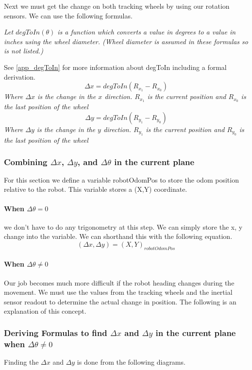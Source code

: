 \documentclass[12pt]{article}
\begin{document}
Next we must get the change on both tracking wheels by using our rotation sensors. We can use the following formulas.

\textit{Let $degToIn(\theta)$ is a function which converts a value in degrees to a value in inches using the wheel diameter. (Wheel diameter is assumed in these formulas so is not listed.)}

See \ref{app_degToIn} for more information about degToIn including a formal derivation.
$$
    \Delta x = degToIn(R_{x_1} - R_{x_0})
$$
\textit{Where $\Delta x$ is the change in the $x$ direction. $R_{x_1}$ is the current position and $R_{x_0}$ is the last position of the wheel}
$$
    \Delta y = degToIn(R_{y_1} - R_{y_0})
$$
\textit{Where $\Delta y$ is the change in the $y$ direction. $R_{y_1}$ is the current position and $R_{y_0}$ is the last position of the wheel}

\subsubsection{Combining $\Delta x$, $\Delta y$, and $\Delta\theta$ in the current plane}
    For this section we define a variable robotOdomPos to store the odom position relative to the robot. This variable stores a (X,Y) coordinate.
\paragraph{When $\Delta\theta = 0$}
    we don't have to do any trigonometry at this step. We can simply store the x, y change into the variable. We can shorthand this with the following equation.
    $$ (\Delta x, \Delta y) = (X,Y)_{robotOdomPos} $$
\paragraph{When $\Delta\theta \neq 0$}\label{deltaneqtheta}
Our job becomes much more difficult if the robot heading changes during the movement. We must use the values from the tracking wheels and the inertial sensor readout to determine the actual change in position. The following is an explanation of this concept.

\subsubsection{Deriving Formulas to find $\Delta x$ and $\Delta y$ in the current plane when $\Delta\theta \neq 0$} \label{app_trighell}

Finding the $\Delta x$ and $\Delta y$ is done from the following diagrams.
\end{document}
